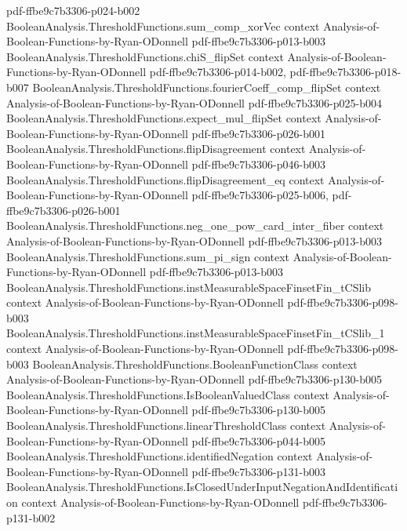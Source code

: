\begin{theorem}
  {pdf-ffbe9c7b3306-p024-b002}
\proofstep
  {BooleanAnalysis.ThresholdFunctions.sum_comp_xorVec}
  {context}
  {Analysis-of-Boolean-Functions-by-Ryan-ODonnell}
  {pdf-ffbe9c7b3306-p013-b003}
\proofstep
  {BooleanAnalysis.ThresholdFunctions.chiS_flipSet}
  {context}
  {Analysis-of-Boolean-Functions-by-Ryan-ODonnell}
  {pdf-ffbe9c7b3306-p014-b002,
    pdf-ffbe9c7b3306-p018-b007}
\proofstep
  {BooleanAnalysis.ThresholdFunctions.fourierCoeff_comp_flipSet}
  {context}
  {Analysis-of-Boolean-Functions-by-Ryan-ODonnell}
  {pdf-ffbe9c7b3306-p025-b004}
\proofstep
  {BooleanAnalysis.ThresholdFunctions.expect_mul_flipSet}
  {context}
  {Analysis-of-Boolean-Functions-by-Ryan-ODonnell}
  {pdf-ffbe9c7b3306-p026-b001}
\proofstep
  {BooleanAnalysis.ThresholdFunctions.flipDisagreement}
  {context}
  {Analysis-of-Boolean-Functions-by-Ryan-ODonnell}
  {pdf-ffbe9c7b3306-p046-b003}
\proofstep
  {BooleanAnalysis.ThresholdFunctions.flipDisagreement_eq}
  {context}
  {Analysis-of-Boolean-Functions-by-Ryan-ODonnell}
  {pdf-ffbe9c7b3306-p025-b006,
    pdf-ffbe9c7b3306-p026-b001}
\proofstep
  {BooleanAnalysis.ThresholdFunctions.neg_one_pow_card_inter_fiber}
  {context}
  {Analysis-of-Boolean-Functions-by-Ryan-ODonnell}
  {pdf-ffbe9c7b3306-p013-b003}
\proofstep
  {BooleanAnalysis.ThresholdFunctions.sum_pi_sign}
  {context}
  {Analysis-of-Boolean-Functions-by-Ryan-ODonnell}
  {pdf-ffbe9c7b3306-p013-b003}
\proofstep
  {BooleanAnalysis.ThresholdFunctions.instMeasurableSpaceFinsetFin_tCSlib}
  {context}
  {Analysis-of-Boolean-Functions-by-Ryan-ODonnell}
  {pdf-ffbe9c7b3306-p098-b003}
\proofstep
  {BooleanAnalysis.ThresholdFunctions.instMeasurableSpaceFinsetFin_tCSlib_1}
  {context}
  {Analysis-of-Boolean-Functions-by-Ryan-ODonnell}
  {pdf-ffbe9c7b3306-p098-b003}
\proofstep
  {BooleanAnalysis.ThresholdFunctions.BooleanFunctionClass}
  {context}
  {Analysis-of-Boolean-Functions-by-Ryan-ODonnell}
  {pdf-ffbe9c7b3306-p130-b005}
\proofstep
  {BooleanAnalysis.ThresholdFunctions.IsBooleanValuedClass}
  {context}
  {Analysis-of-Boolean-Functions-by-Ryan-ODonnell}
  {pdf-ffbe9c7b3306-p130-b005}
\proofstep
  {BooleanAnalysis.ThresholdFunctions.linearThresholdClass}
  {context}
  {Analysis-of-Boolean-Functions-by-Ryan-ODonnell}
  {pdf-ffbe9c7b3306-p044-b005}
\proofstep
  {BooleanAnalysis.ThresholdFunctions.identifiedNegation}
  {context}
  {Analysis-of-Boolean-Functions-by-Ryan-ODonnell}
  {pdf-ffbe9c7b3306-p131-b003}
\proofstep
  {BooleanAnalysis.ThresholdFunctions.IsClosedUnderInputNegationAndIdentification}
  {context}
  {Analysis-of-Boolean-Functions-by-Ryan-ODonnell}
  {pdf-ffbe9c7b3306-p131-b002}

\end{theorem}
